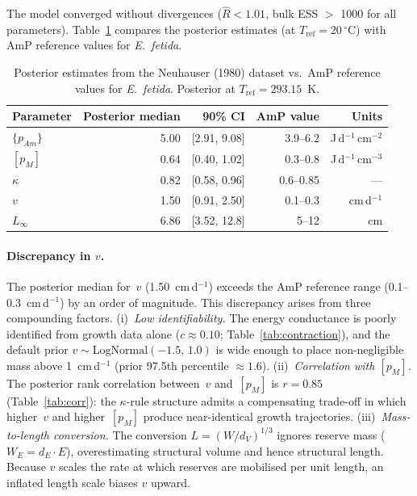 \documentclass[article,shortnames]{jss}
\newcommand{\pAm}{\{p_{Am}\}}
\newcommand{\pM}{[p_M]}
\begin{document}
The model converged without divergences ($\hat{R} < 1.01$, bulk ESS
$>$ 1000 for all parameters).  Table~\ref{tab:realdata} compares
the posterior estimates (at $T_{\mathrm{ref}} = 20\,^\circ$C) with
AmP reference values for \emph{E.~fetida}.

\begin{table}[t!]
\centering
\caption{Posterior estimates from the Neuhauser (1980) dataset vs.\
  AmP reference values for \emph{E.~fetida}.  Posterior at
  $T_\mathrm{ref} = 293.15$~K.}
\label{tab:realdata}
\begin{tabular}{lrrrr}
\toprule
Parameter & Posterior median & 90\% CI & AmP value & Units \\
\midrule
$\pAm$     & 5.00 & [2.91, 9.08] & 3.9--6.2 &
  J\,d$^{-1}$\,cm$^{-2}$ \\
$\pM$      & 0.64 & [0.40, 1.02] & 0.3--0.8 &
  J\,d$^{-1}$\,cm$^{-3}$ \\
$\kappa$   & 0.82 & [0.58, 0.96] & 0.6--0.85 & --- \\
$v$        & 1.50 & [0.91, 2.50] & 0.1--0.3 & cm\,d$^{-1}$ \\
$L_\infty$ & 6.86 & [3.52, 12.8] & 5--12 & cm \\
\bottomrule
\end{tabular}
\end{table}


\paragraph{Discrepancy in $v$.}
The posterior median for~$v$ (1.50~cm\,d$^{-1}$) exceeds the AmP
reference range (0.1--0.3~cm\,d$^{-1}$) by an order of magnitude.
This discrepancy arises from three compounding factors.
(i)~\emph{Low identifiability.}  The energy conductance is poorly
identified from growth data alone ($c \approx 0.10$;
Table~\ref{tab:contraction}), and the default prior
$v \sim \mathrm{LogNormal}(-1.5,\, 1.0)$ is wide enough to place
non-negligible mass above 1~cm\,d$^{-1}$ (prior 97.5th percentile
$\approx 1.6$).
(ii)~\emph{Correlation with $\pM$.}  The posterior rank
correlation between~$v$ and~$\pM$ is $r = 0.85$
(Table~\ref{tab:corr}): the $\kappa$-rule structure admits a
compensating trade-off in which higher~$v$ and higher~$\pM$ produce
near-identical growth trajectories.
(iii)~\emph{Mass-to-length conversion.}  The conversion
$L = (W / d_V)^{1/3}$ ignores reserve mass ($W_E = d_E \cdot E$),
overestimating structural volume and hence structural length.
Because $v$ scales the rate at which reserves are mobilised per
unit length, an inflated length scale biases $v$ upward.
\end{document}
